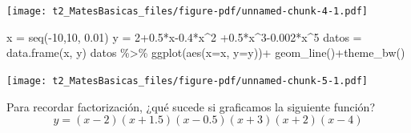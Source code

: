 \documentclass[
  letterpaper,
  DIV=11,
  numbers=noendperiod]{scrreprt}
\newenvironment{Shaded}{\begin{snugshade}}{\end{snugshade}}
\newcommand{\AttributeTok}[1]{\textcolor[rgb]{0.40,0.45,0.13}{#1}}
\newcommand{\DecValTok}[1]{\textcolor[rgb]{0.68,0.00,0.00}{#1}}
\newcommand{\FloatTok}[1]{\textcolor[rgb]{0.68,0.00,0.00}{#1}}
\newcommand{\FunctionTok}[1]{\textcolor[rgb]{0.28,0.35,0.67}{#1}}
\newcommand{\NormalTok}[1]{\textcolor[rgb]{0.00,0.23,0.31}{#1}}
\newcommand{\OtherTok}[1]{\textcolor[rgb]{0.00,0.23,0.31}{#1}}
\newcommand{\SpecialCharTok}[1]{\textcolor[rgb]{0.37,0.37,0.37}{#1}}
\begin{document}
\texttt{[image: t2\_MatesBasicas\_files/figure-pdf/unnamed-chunk-4-1.pdf]}

\begin{Shaded}
\begin{Highlighting}[]
\NormalTok{x }\OtherTok{=} \FunctionTok{seq}\NormalTok{(}\SpecialCharTok{{-}}\DecValTok{10}\NormalTok{,}\DecValTok{10}\NormalTok{, }\FloatTok{0.01}\NormalTok{)}
\NormalTok{y }\OtherTok{=} \DecValTok{2}\FloatTok{+0.5}\SpecialCharTok{*}\NormalTok{x}\FloatTok{{-}0.4}\SpecialCharTok{*}\NormalTok{x}\SpecialCharTok{\^{}}\DecValTok{2} \SpecialCharTok{+}\FloatTok{0.5}\SpecialCharTok{*}\NormalTok{x}\SpecialCharTok{\^{}}\DecValTok{3}\FloatTok{{-}0.002}\SpecialCharTok{*}\NormalTok{x}\SpecialCharTok{\^{}}\DecValTok{5}
\NormalTok{datos }\OtherTok{=} \FunctionTok{data.frame}\NormalTok{(x, y)}
\NormalTok{datos }\SpecialCharTok{\%\textgreater{}\%} \FunctionTok{ggplot}\NormalTok{(}\FunctionTok{aes}\NormalTok{(}\AttributeTok{x=}\NormalTok{x, }\AttributeTok{y=}\NormalTok{y))}\SpecialCharTok{+}
  \FunctionTok{geom\_line}\NormalTok{()}\SpecialCharTok{+}\FunctionTok{theme\_bw}\NormalTok{()}
\end{Highlighting}
\end{Shaded}

\texttt{[image: t2\_MatesBasicas\_files/figure-pdf/unnamed-chunk-5-1.pdf]}

\begin{tcolorbox}[enhanced jigsaw, colframe=quarto-callout-note-color-frame, coltitle=black, colback=white, toptitle=1mm, bottomrule=.15mm, bottomtitle=1mm, leftrule=.75mm, opacityback=0, rightrule=.15mm, titlerule=0mm, title=\textcolor{quarto-callout-note-color}{\faInfo}\hspace{0.5em}{Nota}, arc=.35mm, toprule=.15mm, left=2mm, opacitybacktitle=0.6, breakable, colbacktitle=quarto-callout-note-color!10!white]

Para recordar factorización, ¿qué sucede si graficamos la siguiente
función? \[y=(x-2)(x+1.5)(x-0.5)(x+3)(x+2)(x-4)\]

\end{tcolorbox}
\end{document}

